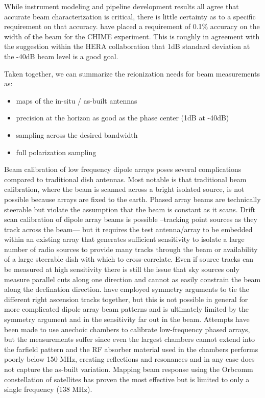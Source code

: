 \documentclass[preprint2,numberedappendix,tighten,twocolappendix]{aastex6}
\begin{document}
While instrument modeling and pipeline development results all agree that accurate beam characterization is critical, there is little certainty as to a specific requirement on that accuracy.  \citet{Shaw2015_chimemmodes} have placed a requirement of 0.1\% accuracy on the width of the beam for the CHIME experiment. This is roughly in agreement with the suggestion within the HERA collaboration that 1dB standard deviation at the -40dB beam level is a good goal.

Taken together, we can summarize the reionization needs for beam measurements as:
\begin{itemize}
\item maps of the in-situ / as-built antennas
\item precision at the horizon as good as the phase center (1dB at -40dB)
\item sampling across the desired bandwidth
\item full polarization sampling
\end{itemize} 




Beam calibration of low frequency dipole arrays poses several complications compared to traditional dish antennas. Most notable is that traditional beam calibration, where the beam is scanned across a bright isolated source, is not possible because arrays are fixed to the earth. Phased array beams are technically steerable but violate the assumption that the beam is constant as it scans. Drift scan calibration of dipole array beams is possible --tracking point sources as they track across the beam--- but it requires the test antenna/array to be embedded within an existing array that generates sufficient sensitivity to isolate a large number of radio sources to provide many tracks through the beam or availability of a large steerable dish with which to cross-correlate\citet{Berger:CHIME_beam_map2016-arxiv}. Even if source tracks can be measured at high sensitivity there is still the issue that sky sources only measure parallel cuts along one direction and cannot as easily constrain the beam along the declination direction. \citet{Pober:2013p9942} have employed symmetry arguments to tie the different right ascension tracks together, but this is not possible in general for more complicated dipole array beam patterns and is ultimately limited by the symmetry argument and in the sensitivity far out in the beam.   Attempts have been made to use anechoic chambers to calibrate low-frequency phased arrays, but the measurements suffer since even the largest chambers cannot extend into the farfield pattern and the RF absorber material used in the chambers performs poorly below 150 MHz, creating reflections and resonances and in any case does not capture the as-built variation. Mapping beam response using the Orbcomm constellation of satellites has proven the most effective \citep{2015RaSc...50..614N,2016:NebenHERAdish} but is limited to only a single frequency (138 MHz).  
\end{document}
